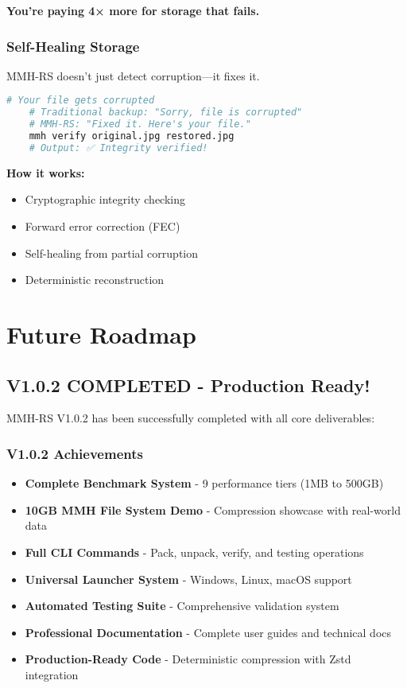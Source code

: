 \documentclass[11pt,a4paper]{article}
\begin{document}
	\textbf{You're paying 4× more for storage that fails.}

	\subsubsection{Self-Healing Storage}

	MMH-RS doesn't just detect corruption—it fixes it.

	\begin{lstlisting}[language=bash]
	# Your file gets corrupted
	# Traditional backup: "Sorry, file is corrupted"
	# MMH-RS: "Fixed it. Here's your file."
	mmh verify original.jpg restored.jpg
	# Output: ✅ Integrity verified!
	\end{lstlisting}

	\textbf{How it works:}
	\begin{itemize}
		\item Cryptographic integrity checking
		\item Forward error correction (FEC)
		\item Self-healing from partial corruption
		\item Deterministic reconstruction
	\end{itemize}

	\section{Future Roadmap}
	\label{sec:roadmap}

	\subsection{V1.0.2 COMPLETED - Production Ready!}

	MMH-RS V1.0.2 has been successfully completed with all core deliverables:

	\subsubsection{V1.0.2 Achievements}
	\begin{itemize}
		\item \textbf{Complete Benchmark System} - 9 performance tiers (1MB to 500GB)
		\item \textbf{10GB MMH File System Demo} - Compression showcase with real-world data
		\item \textbf{Full CLI Commands} - Pack, unpack, verify, and testing operations
		\item \textbf{Universal Launcher System} - Windows, Linux, macOS support
		\item \textbf{Automated Testing Suite} - Comprehensive validation system
		\item \textbf{Professional Documentation} - Complete user guides and technical docs
		\item \textbf{Production-Ready Code} - Deterministic compression with Zstd integration
	\end{itemize}
\end{document}

